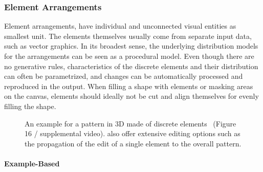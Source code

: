 \subsubsection{Element Arrangements}
\label{subsubsec:analysis_element_arrangements}

Element arrangements,  have individual and unconnected visual entities as smallest unit. The elements themselves usually come from separate input data, such as vector graphics. In its broadest sense, the underlying distribution models for the arrangements can be seen as a procedural model. Even though there are no generative rules, characteristics of the discrete elements and their distribution can often be parametrized, and changes can be automatically processed and reproduced in the output. When filling a shape with elements or masking areas on the canvas, elements should ideally not be cut and align themselves for evenly filling the shape.

\begin{figure}[H]
    \centering
    \caption{\label{fig:ma_2011_det}An example for a pattern in 3D made of discrete elements~\cite{ma_2011_det} (Figure 16 / supplemental video). \citeauthor*{ma_2011_det} also offer extensive editing options such as the propagation of the edit of a single element to the overall pattern. \color{orange}{Status rights: requested}}
\end{figure}

\paragraph*{Example-Based}
\label{para:analysis_element_arrangements_example}


